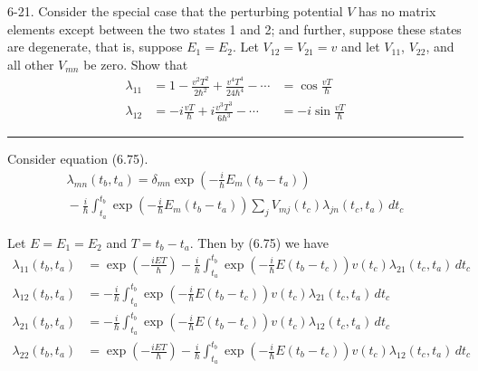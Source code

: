\documentclass[12pt]{article}
\begin{document}
6-21.
Consider the special case that the perturbing potential
$V$ has no matrix elements except between the two states
1 and 2; and further, suppose these states are degenerate,
that is, suppose $E_1=E_2$.
Let $V_{12}=V_{21} = v$ and let $V_{11}$, $V_{22}$, and
all other $V_{mn}$ be zero.
Show that
\begin{align*}
\lambda_{11}&=1-\frac{v^2T^2}{2\hbar^2}+\frac{v^4T^4}{24\hbar^4}-\cdots&=\cos\frac{vT}{\hbar}
\tag{6.81}
\\
\lambda_{12}&=-i\frac{vT}{\hbar}+i\frac{v^3T^3}{6\hbar^3}-\cdots&=-i\sin\frac{vT}{\hbar}
\tag{6.82}
\end{align*}

\bigskip
\hrule

\bigskip
Consider equation (6.75).
\begin{multline*}
\lambda_{mn}(t_b,t_a)=\delta_{mn}
\exp\left(-\frac{i}{\hbar}E_m(t_b-t_a)\right)
\\
{}-\frac{i}{\hbar}
\int_{t_a}^{t_b}
\exp\left(-\frac{i}{\hbar}E_m(t_b-t_a)\right)
\sum_jV_{mj}(t_c)\lambda_{jn}(t_c,t_a)\,dt_c
\tag{6.75}
\end{multline*}

Let $E=E_1=E_2$ and $T=t_b-t_a$.
Then by (6.75) we have
\begin{align*}
\lambda_{11}(t_b,t_a)&=
\exp\left(-\frac{iET}{\hbar}\right)
-\frac{i}{\hbar}
\int_{t_a}^{t_b}
\exp\left(-\frac{i}{\hbar}E(t_b-t_c)\right)
v(t_c)\lambda_{21}(t_c,t_a)\,dt_c
\\
\lambda_{12}(t_b,t_a)&=
-\frac{i}{\hbar}
\int_{t_a}^{t_b}
\exp\left(-\frac{i}{\hbar}E(t_b-t_c)\right)
v(t_c)\lambda_{21}(t_c,t_a)\,dt_c
\\
\lambda_{21}(t_b,t_a)&=
-\frac{i}{\hbar}
\int_{t_a}^{t_b}
\exp\left(-\frac{i}{\hbar}E(t_b-t_c)\right)
v(t_c)\lambda_{12}(t_c,t_a)\,dt_c
\\
\lambda_{22}(t_b,t_a)&=
\exp\left(-\frac{iET}{\hbar}\right)
-\frac{i}{\hbar}
\int_{t_a}^{t_b}
\exp\left(-\frac{i}{\hbar}E(t_b-t_c)\right)
v(t_c)\lambda_{12}(t_c,t_a)\,dt_c
\end{align*}
\end{document}
